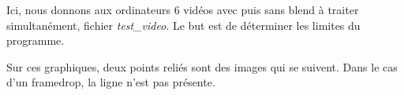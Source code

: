 Ici, nous donnons aux ordinateurs 6 vidéos avec puis sans blend à
traiter simultanément, fichier \textit{test\_video}. Le but est
de déterminer les limites du programme. 
\bigskip

Sur ces graphiques, deux points reliés sont des images qui se
suivent. Dans le cas d'un framedrop, la ligne n'est pas présente.

\begin{figure}[H]%
    \centering
    \qquad
    \label{fig:videoAB}%
\end{figure}

